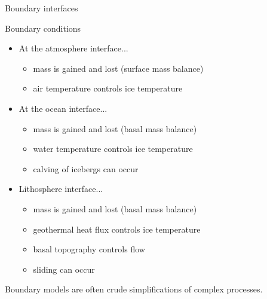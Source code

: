     \begin{frame}[label=model-interfaces]{Boundary interfaces}
      \centering
      \\
      \bigskip
    \end{frame}

    \begin{frame}{Boundary conditions}
      \begin{itemize}
        \item At the atmosphere interface...
          \begin{itemize}
            \item mass is gained and lost (surface mass balance)
            \item air temperature controls ice temperature
          \end{itemize}
        \item At the ocean interface...
          \begin{itemize}
            \item mass is gained and lost (basal mass balance)
            \item water temperature controls ice temperature
            \item calving of icebergs can occur
          \end{itemize}
        \item Lithosphere interface...
          \begin{itemize}
            \item mass is gained and lost (basal mass balance)
            \item geothermal heat flux controls ice temperature
            \item basal topography controls flow
            \item sliding can occur
          \end{itemize}
      \end{itemize}
      \pause
      Boundary models are often crude simplifications of complex processes.
    \end{frame}


